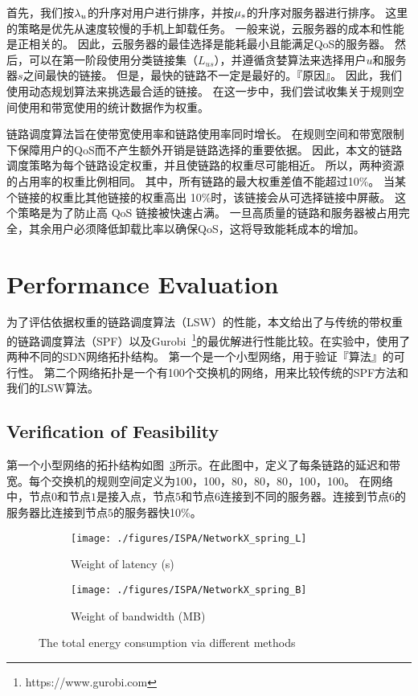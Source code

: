 首先，我们按${\lambda}_{u}$的升序对用户进行排序，并按${\mu}_{s}$的升序对服务器进行排序。 这里的策略是优先从速度较慢的手机上卸载任务。 一般来说，云服务器的成本和性能是正相关的。 因此，云服务器的最佳选择是能耗最小且能满足QoS的服务器。 然后，可以在第一阶段使用分类链接集（$L_{us}$），并遵循贪婪算法来选择用户$u$和服务器$s$之间最快的链接。 但是，最快的链路不一定是最好的。『原因』。 因此，我们使用动态规划算法来挑选最合适的链接。 在这一步中，我们尝试收集关于规则空间使用和带宽使用的统计数据作为权重。

链路调度算法旨在使带宽使用率和链路使用率同时增长。 在规则空间和带宽限制下保障用户的QoS而不产生额外开销是链路选择的重要依据。 因此，本文的链路调度策略为每个链路设定权重，并且使链路的权重尽可能相近。 所以，两种资源的占用率的权重比例相同。 其中，所有链路的最大权重差值不能超过10\%。 当某个链接的权重比其他链接的权重高出 10\%时，该链接会从可选择链接中屏蔽。 这个策略是为了防止高 QoS 链接被快速占满。 一旦高质量的链路和服务器被占用完全，其余用户必须降低卸载比率以确保QoS，这将导致能耗成本的增加。

\section{Performance Evaluation}

为了评估依据权重的链路调度算法（LSW）的性能，本文给出了与传统的带权重的链路调度算法（SPF）以及Gurobi~\footnote{https://www.gurobi.com}的最优解进行性能比较。在实验中，使用了两种不同的SDN网络拓扑结构。 第一个是一个小型网络，用于验证『算法』的可行性。 第二个网络拓扑是一个有100个交换机的网络，用来比较传统的SPF方法和我们的LSW算法。

\subsection{Verification of Feasibility}

第一个小型网络的拓扑结构如图~\ref{fig_smallNetwork}所示。在此图中，定义了每条链路的延迟和带宽。每个交换机的规则空间定义为100，100，80，80，80，100，100。 在网络中，节点$0$和节点$1$是接入点，节点$5$和节点$6$连接到不同的服务器。连接到节点$6$的服务器比连接到节点$5$的服务器快10\%。

\begin{figure}[!h]
  \centering
  \begin{subfigure}[b]{0.45\linewidth}
    \texttt{[image: ./figures/ISPA/NetworkX\_spring\_L]}
    \label{fig_smallNetworkL}
    \caption{Weight of latency (s)}
  \end{subfigure} %
  \begin{subfigure}[b]{0.45\linewidth}    
    \texttt{[image: ./figures/ISPA/NetworkX\_spring\_B]}
    \label{fig_smallNetworkB}    
    \caption{Weight of bandwidth (MB)}
  \end{subfigure} 
  \caption{The total energy consumption via different methods}
  \label{fig_smallNetwork}
\end{figure}

